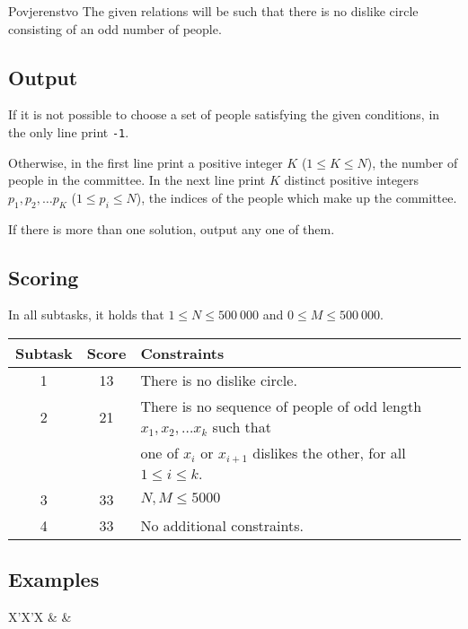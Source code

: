\begin{statement}[
  problempoints=100,
  timelimit=3 seconds,
  memorylimit=512 MiB,
]{Povjerenstvo}
The given relations will be such that there is no dislike circle consisting 
of an odd number of people.

\subsection*{Output}

If it is not possible to choose a set of people satisfying the given conditions, 
in the only line print \texttt{-1}.

Otherwise, in the first line print a positive integer $K$ ($1 \leq K \leq N$), 
the number of people in the committee. In the next line print $K$ distinct 
positive integers $p_1, p_2, \dots p_K$ ($1 \leq p_i \leq N$), the indices of 
the people which make up the committee.

If there is more than one solution, output any one of them.

\subsection*{Scoring}

In all subtasks, it holds that $1 \leq N \leq 500~000$ and $0 \leq M \leq 500~000$.

{\renewcommand{\arraystretch}{1.4}
  \setlength{\tabcolsep}{6pt}
  \begin{tabular}{ccl}
   Subtask & Score & Constraints \\ \midrule
    1 & 13 & There is no dislike circle. \\
    2 & 21 & There is no sequence of people of odd length $x_1, x_2, \dots x_k$ such that \\
      &    & one of $x_i$ or $x_{i+1}$ dislikes the other, for all $1 \leq i \leq k$. \\
    3 & 33 & $N, M \leq 5000$ \\
    4 & 33 & No additional constraints.
\end{tabular}}

\subsection*{Examples}
\begin{tabularx}{\textwidth}{X'X'X}
 &
 &
\end{tabularx}


\end{statement}
